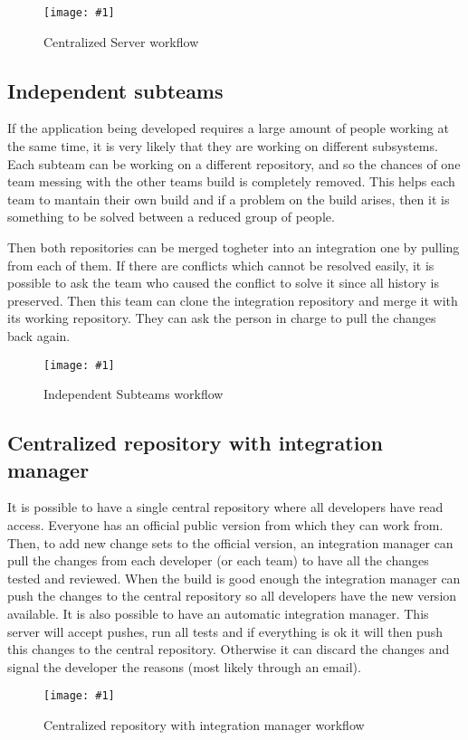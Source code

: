 \documentclass[a4paper,10pt]{article}
\newcommand{\diagrama}[2]{
    \begin{figure}[h]
        \begin{center}
            \texttt{[image: \#1]} 
        \end{center}
        \caption{#2}
    \end{figure}
}
\begin{document}
\diagrama{RepoCentral.jpg}{Centralized Server workflow}


\subsection{Independent subteams}
If the application being developed requires a large amount of people working at the same time, it is very likely that they are working on different subsystems. Each subteam can be working on a different repository, and so the chances of one team messing with the other teams build is completely removed. This helps each team to mantain their own build and if a problem on the build arises, then it is something to be solved between a reduced group of people.

Then both repositories can be merged togheter into an integration one by pulling from each of them. If there are conflicts which cannot be resolved easily, it is possible to ask the team who caused the conflict to solve it since all history is preserved. Then this team can clone the integration repository and merge it with its working repository. They can ask the person in charge to pull the changes back again.

\diagrama{IndependentSubteams.jpg}{Independent Subteams workflow}


\subsection{Centralized repository with integration manager}
It is possible to have a single central repository where all developers have read access. Everyone has an official public version from which they can work from. Then, to add new change sets to the official version, an integration manager can pull the changes from each developer (or each team) to have all the changes tested and reviewed. When the build is good enough the integration manager can push the changes to the central repository so all developers have the new version available.
It is also possible to have an automatic integration manager. This server will accept pushes, run all tests and if everything is ok it will then push this changes to the central repository. Otherwise it can discard the changes and signal the developer the reasons (most likely through an email).

\diagrama{ResponsableIntegracion.jpg}{Centralized repository with integration manager workflow}


\end{document}
